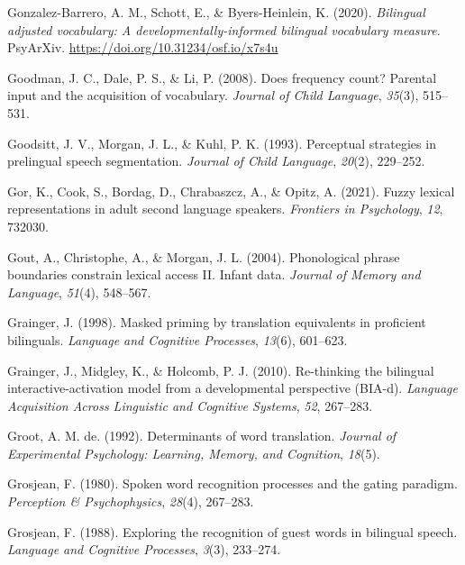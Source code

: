 \documentclass[
  12pt,
  b5paperpaper,
  twoside]{scrreprt}
\newlength{\cslhangindent}
\newlength{\cslentryspacingunit} %
\newenvironment{CSLReferences}[2] %
 {%
  \setlength{\parindent}{0pt}
  \ifodd #1
  \let\oldpar\par
  \def\par{\hangindent=\cslhangindent\oldpar}
  \fi
  \setlength{\parskip}{#2\cslentryspacingunit}
 }%
 {}
\begin{document}
\begin{CSLReferences}{1}{0}
\leavevmode{}%
Gonzalez-Barrero, A. M., Schott, E., \& Byers-Heinlein, K. (2020).
\emph{Bilingual adjusted vocabulary: A developmentally-informed
bilingual vocabulary measure}. {PsyArXiv}.
\url{https://doi.org/10.31234/osf.io/x7s4u}

\leavevmode{}%
Goodman, J. C., Dale, P. S., \& Li, P. (2008). Does frequency count?
Parental input and the acquisition of vocabulary. \emph{Journal of Child
Language}, \emph{35}(3), 515--531.

\leavevmode{}%
Goodsitt, J. V., Morgan, J. L., \& Kuhl, P. K. (1993). Perceptual
strategies in prelingual speech segmentation. \emph{Journal of Child
Language}, \emph{20}(2), 229--252.

\leavevmode{}%
Gor, K., Cook, S., Bordag, D., Chrabaszcz, A., \& Opitz, A. (2021).
Fuzzy lexical representations in adult second language speakers.
\emph{Frontiers in Psychology}, \emph{12}, 732030.

\leavevmode{}%
Gout, A., Christophe, A., \& Morgan, J. L. (2004). Phonological phrase
boundaries constrain lexical access II. Infant data. \emph{Journal of
Memory and Language}, \emph{51}(4), 548--567.

\leavevmode{}%
Grainger, J. (1998). Masked priming by translation equivalents in
proficient bilinguals. \emph{Language and Cognitive Processes},
\emph{13}(6), 601--623.

\leavevmode{}%
Grainger, J., Midgley, K., \& Holcomb, P. J. (2010). Re-thinking the
bilingual interactive-activation model from a developmental perspective
(BIA-d). \emph{Language Acquisition Across Linguistic and Cognitive
Systems}, \emph{52}, 267--283.

\leavevmode{}%
Groot, A. M. de. (1992). Determinants of word translation. \emph{Journal
of Experimental Psychology: Learning, Memory, and Cognition},
\emph{18}(5).

\leavevmode{}%
Grosjean, F. (1980). Spoken word recognition processes and the gating
paradigm. \emph{Perception \& Psychophysics}, \emph{28}(4), 267--283.

\leavevmode{}%
Grosjean, F. (1988). Exploring the recognition of guest words in
bilingual speech. \emph{Language and Cognitive Processes}, \emph{3}(3),
233--274.


\end{CSLReferences}
\end{document}
